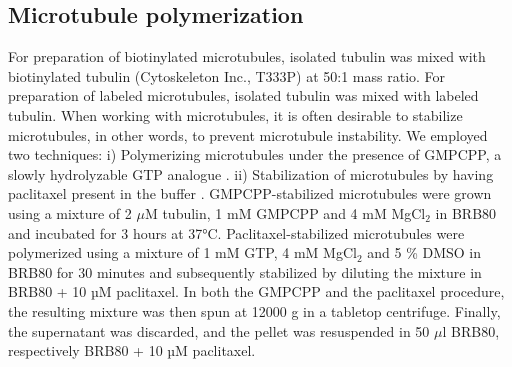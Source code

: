 \subsection{Microtubule polymerization}
For preparation of biotinylated microtubules, isolated tubulin was mixed with biotinylated tubulin (Cytoskeleton Inc., T333P) at 50:1 mass ratio. For preparation of labeled microtubules, isolated tubulin was mixed with labeled tubulin. When working with microtubules, it is often desirable to stabilize microtubules, in other words, to prevent microtubule instability. We employed two techniques: i) Polymerizing microtubules under the presence of GMPCPP, a slowly hydrolyzable GTP analogue \parencite{Hyman1992}. ii) Stabilization of microtubules by having paclitaxel present in the buffer \parencite{SCHIFF1979}. GMPCPP-stabilized microtubules were grown using a mixture of 2 $\mu$M tubulin, 1 mM GMPCPP and 4 mM MgCl$_2$ in BRB80 and incubated for 3 hours at 37°C. Paclitaxel-stabilized microtubules were polymerized using a mixture of 1 mM GTP, 4 mM MgCl$_2$ and 5 \% DMSO in BRB80 for 30 minutes and subsequently stabilized by diluting the mixture in BRB80 + 10 µM paclitaxel. In both the GMPCPP and the paclitaxel procedure, the resulting mixture was then spun at 12000 g in a tabletop centrifuge. Finally, the supernatant was discarded, and the pellet was resuspended in 50 $\mu$l BRB80, respectively BRB80 + 10 µM paclitaxel.

